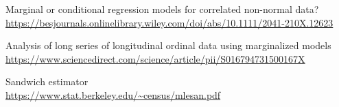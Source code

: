 \documentclass[mathserif]{beamer}
\begin{document}
\begin{frame}
		
\begin{itemization}

\item Marginal or conditional regression models for correlated non-normal data?\\
	\url{https://besjournals.onlinelibrary.wiley.com/doi/abs/10.1111/2041-210X.12623}



\item Analysis of long series of longitudinal ordinal data using marginalized models\\
	\url{https://www.sciencedirect.com/science/article/pii/S016794731500167X}
	
\item Sandwich estimator\\
		\url{https://www.stat.berkeley.edu/~census/mlesan.pdf}


\end{itemization}

\end{frame}
	
\end{document}
